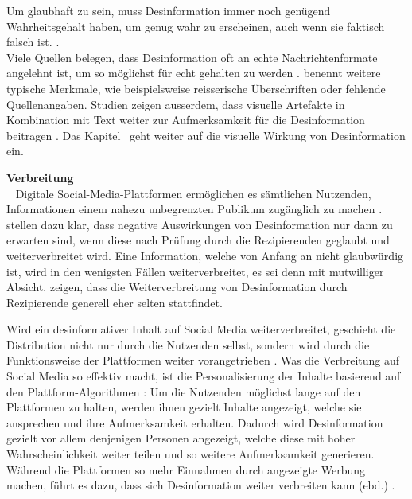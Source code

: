 \documentclass[12pt,a4paper]{article}        %
\begin{document}
Um glaubhaft zu sein, muss Desinformation immer noch genügend Wahrheitsgehalt haben, um genug wahr zu erscheinen, auch wenn sie faktisch falsch ist. \parencite[Pennycook et al. (2018), zit\ nach][182]{weidner_fake_2019}. \\
Viele Quellen belegen, dass Desinformation oft an echte Nachrichtenformate angelehnt ist, um so möglichst für echt gehalten zu werden \parencites[3]{tandoc_jr_facts_2019}[213]{allcott_social_2017}[1094]{lazer_science_2018}[10f]{grujic_warnhinweise_2024}. \textcite[15]{grujic_warnhinweise_2024} benennt weitere typische Merkmale, wie beispielsweise reisserische Überschriften oder fehlende Quellenangaben. Studien zeigen ausserdem, dass visuelle Artefakte in Kombination mit Text weiter zur Aufmerksamkeit für die Desinformation beitragen \parencites[3701]{weikmann_visual_2023}[182]{weidner_fake_2019}. Das Kapitel~ geht weiter auf die visuelle Wirkung von Desinformation ein.

\textbf{Verbreitung}\\
~\label{theory_distribution}
Digitale Social-Media-Plattformen ermöglichen es sämtlichen Nutzenden, Informationen einem nahezu unbegrenzten Publikum zugänglich zu machen \parencite[147]{marx_fake_2020}. \textcite[485]{schaewitz_when_2020} stellen dazu klar, dass negative Auswirkungen von Desinformation nur dann zu erwarten sind, wenn diese nach Prüfung durch die Rezipierenden geglaubt und weiterverbreitet wird. Eine Information, welche von Anfang an nicht glaubwürdig ist, wird in den wenigsten Fällen weiterverbreitet, es sei denn mit mutwilliger Absicht. \textcite{guess_less_2019} zeigen, dass die Weiterverbreitung von Desinformation durch Rezipierende generell eher selten stattfindet.

Wird ein desinformativer Inhalt auf Social Media weiterverbreitet, geschieht die Distribution nicht nur durch die Nutzenden selbst, sondern wird durch die Funktionsweise der Plattformen weiter vorangetrieben \parencite[vgl.\ auch][199]{krafft_disinformation_2020}.
Was die Verbreitung auf Social Media so effektiv macht, ist die Personalisierung der Inhalte basierend auf den Plattform-Algorithmen \parencite[219f]{schmidt_meinungsbildung_2022}: Um die Nutzenden möglichst lange auf den Plattformen zu halten, werden ihnen gezielt Inhalte angezeigt, welche sie ansprechen und ihre Aufmerksamkeit erhalten. Dadurch wird Desinformation gezielt vor allem denjenigen Personen angezeigt, welche diese mit hoher Wahrscheinlichkeit weiter teilen und so weitere Aufmerksamkeit generieren. Während die Plattformen so mehr Einnahmen durch angezeigte Werbung machen, führt es dazu, dass sich Desinformation weiter verbreiten kann (ebd.) \parencite[vgl.\ auch][967]{ghai_deep-learning-based_2024}.
\end{document}
